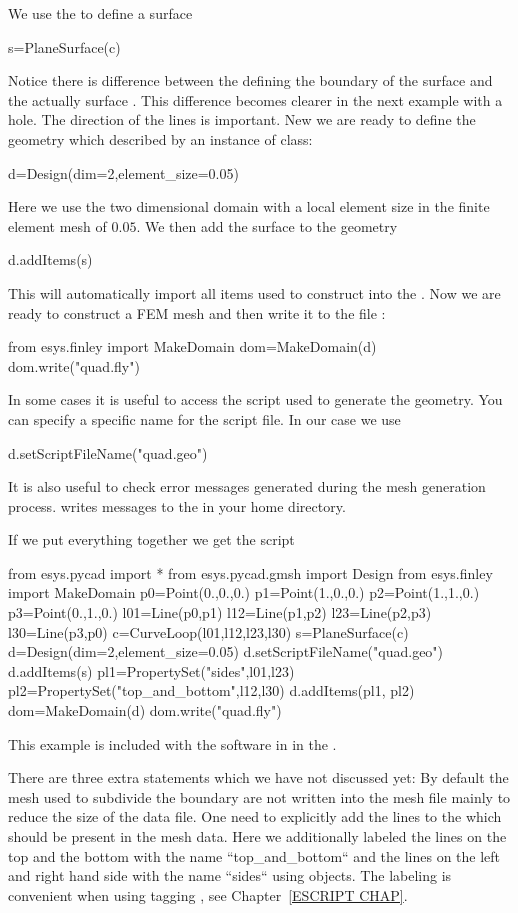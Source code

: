 We use the  to define a surface
\begin{python}
s=PlaneSurface(c)
\end{python}
Notice there is difference between the  defining the boundary
of the surface and the actually surface . This difference becomes clearer in the next example with a hole. The direction of the lines is important.
New we are ready to define the geometry which described by an instance of  class:
\begin{python}
d=Design(dim=2,element_size=0.05)
\end{python}
Here we use the two dimensional domain with a local element size in the finite element mesh of $0.05$.
We then add the surface  to the geometry
\begin{python}
d.addItems(s)
\end{python}
This will automatically import all items used to construct  into the  .
Now we are ready to construct a \finley FEM mesh and then write it to the file :
\begin{python}
from esys.finley import MakeDomain
dom=MakeDomain(d)
dom.write("quad.fly")
\end{python}
In some cases it is useful to access the script used to generate the geometry. You can specify a specific name
for the script file. In our case we use
\begin{python}
d.setScriptFileName("quad.geo")
\end{python}
It is also useful to check error messages generated during the mesh generation process. \gmshextern writes
messages to the  in your home directory.

If we put everything together we get the script
\begin{python}
from esys.pycad import *
from esys.pycad.gmsh import Design
from esys.finley import MakeDomain
p0=Point(0.,0.,0.)
p1=Point(1.,0.,0.)
p2=Point(1.,1.,0.)
p3=Point(0.,1.,0.)
l01=Line(p0,p1)
l12=Line(p1,p2)
l23=Line(p2,p3)
l30=Line(p3,p0)
c=CurveLoop(l01,l12,l23,l30)
s=PlaneSurface(c)
d=Design(dim=2,element_size=0.05)
d.setScriptFileName("quad.geo")
d.addItems(s)
pl1=PropertySet("sides",l01,l23)
pl2=PropertySet("top_and_bottom",l12,l30)
d.addItems(pl1, pl2)
dom=MakeDomain(d)
dom.write("quad.fly")
\end{python}
This example is included with the software in
 in the \ExampleDirectory.

There are three extra statements which we have not discussed yet: By default the mesh used to subdivide
the boundary are not written into the mesh file mainly to reduce the size of the data file. One need to explicitly add the lines to the  \Design which should be present in the mesh data. Here we additionally labeled the
lines on the top and the bottom with the name ``top_and_bottom`` and the lines on the left and right hand side
with the name ``sides`` using  objects. The labeling is convenient
when using tagging , see Chapter~\ref{ESCRIPT CHAP}.

